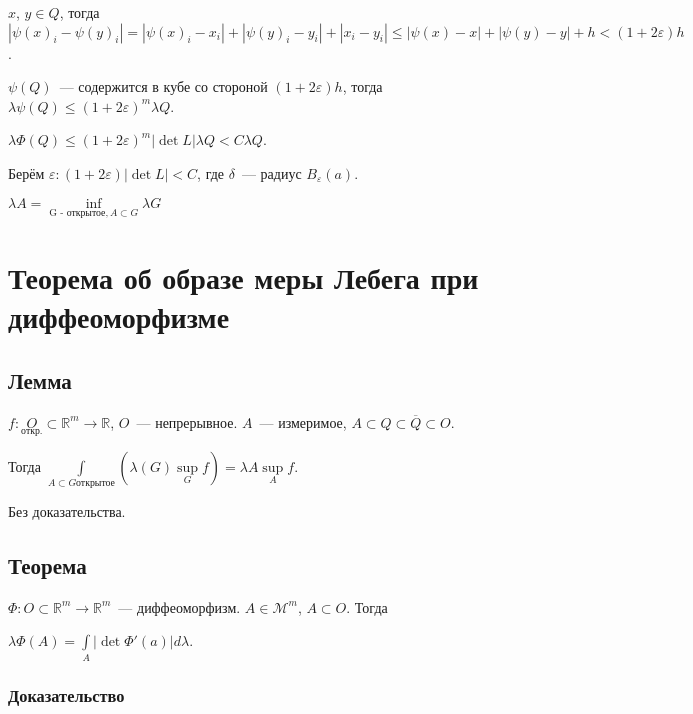 \documentclass{article}
\begin{document}
            $x$, $y \in Q$, тогда $\left| \psi(x)_i - \psi(y)_i \right| = \left| \psi(x)_i - x_i \right| + \left| \psi(y)_i - y_i \right| + |x_i - y_i| \leqslant | \psi(x) - x | + |\psi(y) - y| + h < (1 + 2 \varepsilon)h$.
            
            $\psi(Q)$~--- содержится в кубе со стороной $(1 + 2 \varepsilon) h$, тогда $\lambda \psi(Q) \leqslant (1 + 2 \varepsilon)^m \lambda Q$.
            
            $\lambda \Phi(Q) \leqslant (1 + 2 \varepsilon)^m | \det L | \lambda Q < C \lambda Q$.
            
            Берём $\varepsilon : (1 + 2 \varepsilon) | \det L | < C$, где $\delta$~--- радиус $B_{\varepsilon} (a)$.
            
    $\lambda A = \inf\limits_{\text{G - открытое}, A \subset G} \lambda G$
            
    \newpage
    
    \section{Теорема об образе меры Лебега при диффеоморфизме}
    
        \subsection{Лемма}
    
            $f : \underset{\text{откр.}}{O} \subset \mathbb{R}^m \rightarrow \mathbb{R}$, $O$~--- непрерывное. $A$~--- измеримое, $A \subset Q \subset \overline{Q} \subset O$.
        
            Тогда $\int\limits_{A \subset G \text{открытое}} \left( \lambda (G) \sup\limits_{G} f \right) = \lambda A \sup\limits_{A} f$.
            
            Без доказательства.
        
        \subsection{Теорема}
        
            $\Phi : O \subset \mathbb{R}^m \rightarrow \mathbb{R}^m$~--- диффеоморфизм. $A \in \mathcal{M}^m$, $A \subset O$. Тогда
        
            $\lambda \Phi(A) = \int\limits_{A} \left| \det \Phi'(a) \right| d \lambda$.
        
        \subsubsection{Доказательство}
        
\end{document}

